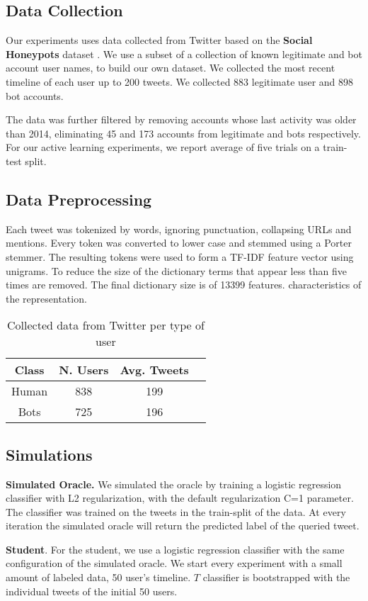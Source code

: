 \subsection{Data Collection}
%
Our experiments uses data collected from Twitter based on the \textbf{Social Honeypots} dataset \cite{lee:aaai11}. We use a subset of a collection of known legitimate and bot account user names, to build our own dataset. We collected the most recent timeline of each user up to 200 tweets. We collected 883 legitimate user and 898 bot accounts. 

The data was further filtered by removing accounts whose last activity was older than 2014, eliminating 45 and 173 accounts from legitimate and bots respectively. For our active learning experiments, we report average of five trials on a train-test split. 


\subsection{Data Preprocessing}
%
Each tweet was tokenized by words, ignoring punctuation, collapsing URLs and mentions. Every token was converted to lower case and stemmed using a Porter stemmer. The resulting tokens were used to form a TF-IDF feature vector using unigrams. To reduce the size of the dictionary terms that appear less than five times are removed. The final dictionary size is of 13399 features.  characteristics of the representation.

\begin{table}[htdp]
\caption{Collected data from Twitter per type of user}
\begin{center}
\begin{tabular}{|c|c|c|c|} \hline
\textbf{Class} & \textbf{N. Users} &\textbf{Avg. Tweets} \\  \hline
Human & 838 & 199 \\ \hline
Bots & 725  & 196 \\ \hline
\end{tabular}
\end{center}
\label{tab:data}
\end{table}%
 
\subsection{Simulations}

\textbf{Simulated Oracle.} We simulated the oracle by training a logistic regression classifier with L2 regularization, with the default regularization C=1 parameter. The classifier was trained on the tweets in the train-split of the data. At every iteration the simulated oracle will return the predicted label of the queried tweet. 

\textbf{Student}. For the student, we use a logistic regression classifier with the same configuration of the simulated oracle. We start every experiment with a small amount of labeled data, 50 user's timeline. $T$ classifier is bootstrapped with the individual tweets of the initial 50 users. 
